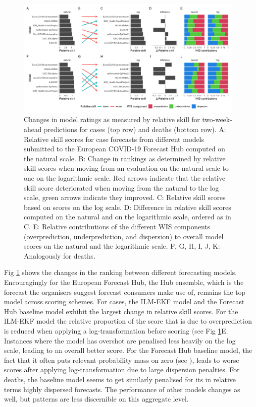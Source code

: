 \documentclass[10pt,letterpaper]{article}
\begin{document}
\begin{figure}[h!]
    \centering
    \includegraphics[width=0.99\textwidth]{../output/figures/HUB-pairwise-comparisons.png}
    \caption{Changes in model ratings as measured by relative skill for two-week-ahead predictions for cases (top row) and deaths (bottom row). A: Relative skill scores for case forecasts from different models submitted to the European COVID-19 Forecast Hub computed on the natural scale. B: Change in rankings as determined by relative skill scores when moving from an evaluation on the natural scale to one on the logarithmic scale. Red arrows indicate that the relative skill score deteriorated when moving from the natural to the log scale, green arrows indicate they improved. C: Relative skill scores based on scores on the log scale. D: Difference in relative skill scores computed on the natural and on the logarithmic scale, ordered as in C. E: Relative contributions of the different WIS components (overprediction, underprediction, and dispersion) to overall model scores on the natural and the logarithmic scale. F, G, H, I, J, K: Analogously for deaths.}
    \label{fig:HUB-rank-order}
\end{figure}

Fig \ref{fig:HUB-rank-order} shows the changes in the ranking between different forecasting models. Encouragingly for the European Forecast Hub, the Hub ensemble, which is the forecast the organisers suggest forecast consumers make use of, remains the top model across scoring schemes. For cases, the ILM-EKF model and the Forecast Hub baseline model exhibit the largest change in relative skill scores. For the ILM-EKF model the relative proportion of the score that is due to overprediction is reduced when applying a log-transformation before scoring (see Fig \ref{fig:HUB-rank-order}E. Instances where the model has overshot are penalised less heavily on the log scale, leading to an overall better score. For the Forecast Hub baseline model, the fact that it often puts relevant probability mass on zero (see ), leads to worse scores after applying log-transformation due to large dispersion penalties. For deaths, the baseline model seems to get similarly penalised for its in relative terms highly dispersed forecasts. The performance of other models changes as well, but patterns are less discernible on this aggregate level. 
\end{document}
